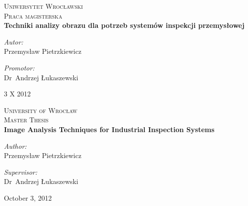 \newcommand{\coverPage}[6]
{
	\begin{titlingpage}
	\begin{center}



	\textsc{\LARGE #1}\\[1.5cm]

	\textsc{\Large #2}\\[0.5cm]



	{ \huge \bfseries #3}\\[0.4cm]


	\begin{minipage}{0.4\textwidth}
	\begin{flushleft} \large
	\vspace{15cm}
	\emph{#4:}\\
	Przemys\l aw Pietrzkiewicz
	\end{flushleft}
	\end{minipage}
	\begin{minipage}{0.4\textwidth}
	\begin{flushright} \large
	\vspace{15cm}
	\emph{#5:} \\
	Dr~Andrzej \L ukaszewski
	\end{flushright}
	\end{minipage}

	\vfill

	{\large #6}

	\end{center}
	\end{titlingpage}



	\thispagestyle{empty}
	\newpage	

}

\coverPage
{Uniwersytet Wroc\l awski}
{Praca magisterska}
{Techniki analizy obrazu dla potrzeb system\'ow inspekcji przemys\l owej}
{Autor}
{Promotor}
{3 X 2012}

\newpage

\coverPage
{University of Wroc\l aw}
{Master Thesis}
{Image Analysis Techniques for Industrial Inspection Systems}
{Author}
{Supervisor}
{October 3, 2012}